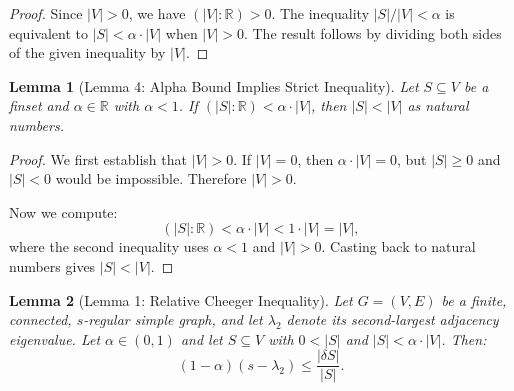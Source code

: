 \documentclass[11pt]{article}
\theoremstyle{plain}
\newtheorem*{lemma}{Lemma}
\theoremstyle{definition}
\theoremstyle{remark}
\begin{document}
\begin{proof}
Since $|V| > 0$, we have $(|V| : \mathbb{R}) > 0$. The inequality $|S|/|V| < \alpha$ is equivalent to $|S| < \alpha \cdot |V|$ when $|V| > 0$. The result follows by dividing both sides of the given inequality by $|V|$.
\end{proof}

\begin{lemma}[Lemma 4: Alpha Bound Implies Strict Inequality]
Let $S \subseteq V$ be a finset and $\alpha \in \mathbb{R}$ with $\alpha < 1$. If $(|S| : \mathbb{R}) < \alpha \cdot |V|$, then $|S| < |V|$ as natural numbers.
\end{lemma}

\begin{proof}
We first establish that $|V| > 0$. If $|V| = 0$, then $\alpha \cdot |V| = 0$, but $|S| \geq 0$ and $|S| < 0$ would be impossible. Therefore $|V| > 0$. 

Now we compute:
\[
(|S| : \mathbb{R}) < \alpha \cdot |V| < 1 \cdot |V| = |V|,
\]
where the second inequality uses $\alpha < 1$ and $|V| > 0$. Casting back to natural numbers gives $|S| < |V|$.
\end{proof}

\begin{lemma}[Lemma 1: Relative Cheeger Inequality]
Let $G = (V, E)$ be a finite, connected, $s$-regular simple graph, and let $\lambda_2$ denote its second-largest adjacency eigenvalue. Let $\alpha \in (0,1)$ and let $S \subseteq V$ with $0 < |S|$ and $|S| < \alpha \cdot |V|$. Then:
\[
(1 - \alpha)(s - \lambda_2) \leq \frac{|\delta S|}{|S|}.
\]
\end{lemma}
\end{document}
